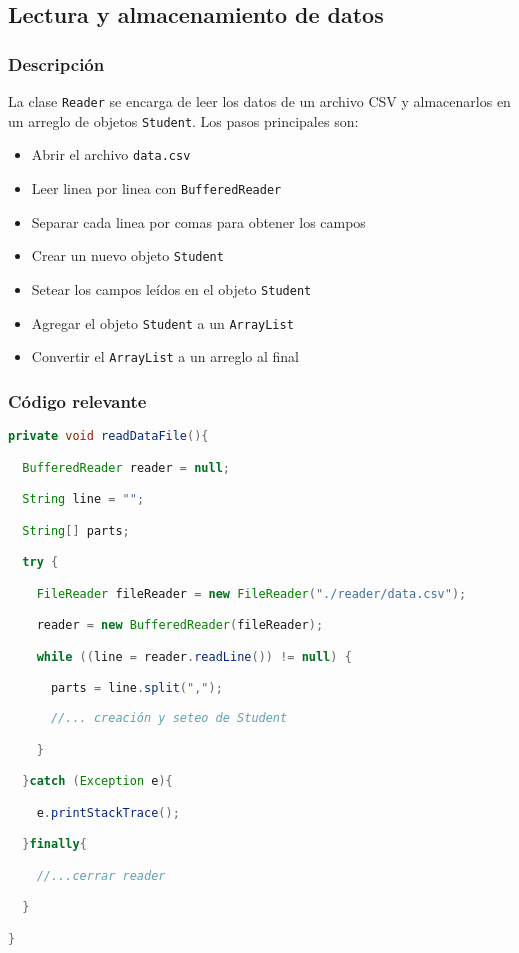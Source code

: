 \subsection{Lectura y almacenamiento de datos}

\subsubsection{Descripción}

La clase \texttt{Reader} se encarga de leer los datos de un archivo CSV y almacenarlos en un arreglo de objetos \texttt{Student}. Los pasos principales son:

\begin{itemize}
\item Abrir el archivo \texttt{data.csv} 
\item Leer linea por linea con \texttt{BufferedReader}
\item Separar cada linea por comas para obtener los campos
\item Crear un nuevo objeto \texttt{Student}
\item Setear los campos leídos en el objeto \texttt{Student}
\item Agregar el objeto \texttt{Student} a un \texttt{ArrayList}
\item Convertir el \texttt{ArrayList} a un arreglo al final
\end{itemize}

\subsubsection{Código relevante}

\begin{lstlisting}[language=Java,caption=Método para leer archivo CSV,]
private void readDataFile(){

  BufferedReader reader = null;

  String line = "";

  String[] parts;

  try {

    FileReader fileReader = new FileReader("./reader/data.csv");

    reader = new BufferedReader(fileReader);

    while ((line = reader.readLine()) != null) {

      parts = line.split(",");
      
      //... creación y seteo de Student

    }

  }catch (Exception e){

    e.printStackTrace();

  }finally{

    //...cerrar reader

  }

}
\end{lstlisting}

